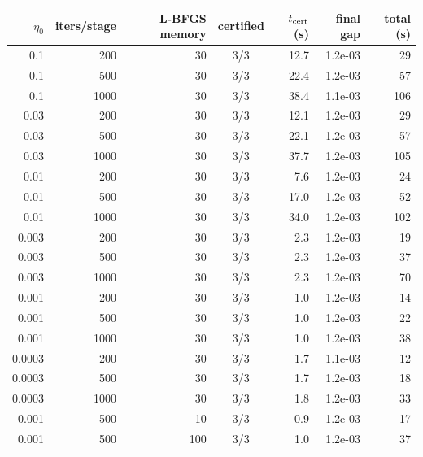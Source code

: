 \begin{tabular}{r r r c r r r}\toprule
$\eta_0$ & iters/stage & L-BFGS memory & certified & $t_{\rm cert}$ (s) & final gap & total (s)\\\midrule
0.1 & 200 & 30 & 3/3 & 12.7 & 1.2e-03 & 29 \\
0.1 & 500 & 30 & 3/3 & 22.4 & 1.2e-03 & 57 \\
0.1 & 1000 & 30 & 3/3 & 38.4 & 1.1e-03 & 106 \\
0.03 & 200 & 30 & 3/3 & 12.1 & 1.2e-03 & 29 \\
0.03 & 500 & 30 & 3/3 & 22.1 & 1.2e-03 & 57 \\
0.03 & 1000 & 30 & 3/3 & 37.7 & 1.2e-03 & 105 \\
0.01 & 200 & 30 & 3/3 & 7.6 & 1.2e-03 & 24 \\
0.01 & 500 & 30 & 3/3 & 17.0 & 1.2e-03 & 52 \\
0.01 & 1000 & 30 & 3/3 & 34.0 & 1.2e-03 & 102 \\
0.003 & 200 & 30 & 3/3 & 2.3 & 1.2e-03 & 19 \\
0.003 & 500 & 30 & 3/3 & 2.3 & 1.2e-03 & 37 \\
0.003 & 1000 & 30 & 3/3 & 2.3 & 1.2e-03 & 70 \\
0.001 & 200 & 30 & 3/3 & 1.0 & 1.2e-03 & 14 \\
0.001 & 500 & 30 & 3/3 & 1.0 & 1.2e-03 & 22 \\
0.001 & 1000 & 30 & 3/3 & 1.0 & 1.2e-03 & 38 \\
0.0003 & 200 & 30 & 3/3 & 1.7 & 1.1e-03 & 12 \\
0.0003 & 500 & 30 & 3/3 & 1.7 & 1.2e-03 & 18 \\
0.0003 & 1000 & 30 & 3/3 & 1.8 & 1.2e-03 & 33 \\
0.001 & 500 & 10 & 3/3 & 0.9 & 1.2e-03 & 17 \\
0.001 & 500 & 100 & 3/3 & 1.0 & 1.2e-03 & 37 \\
\bottomrule\end{tabular}
